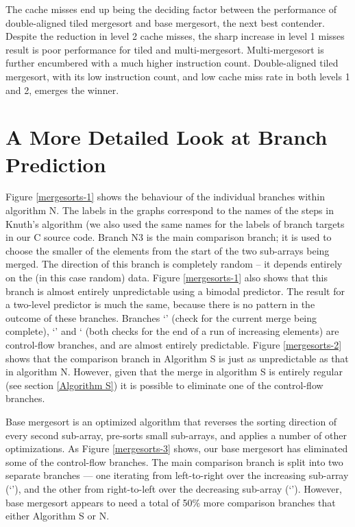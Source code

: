 The cache misses end up being the deciding factor between the performance of
double-aligned tiled mergesort and base mergesort, the next best contender.
Despite the reduction in level 2 cache misses, the sharp increase in level 1
misses result is poor performance for tiled and multi-mergesort. Multi-mergesort
is further encumbered with a much higher instruction count. Double-aligned tiled
mergesort, with its low instruction count, and low cache miss rate in both
levels 1 and 2, emerges the winner.

\section{A More Detailed Look at Branch Prediction}


Figure \ref{mergesorts-1} shows the behaviour of the individual branches within
algorithm N.  The labels in the graphs correspond to the names of the steps in
Knuth's algorithm (we also used the same names for the labels of branch targets
in our C source code. Branch N3 is the main comparison branch; it is used to
choose the smaller of the elements from the start of the two sub-arrays being
merged. The direction of this branch is completely random -- it depends entirely
on the (in this case random) data. Figure \ref{mergesorts-1} also shows that
this branch is almost entirely unpredictable using a bimodal predictor. The
result for a two-level predictor is much the same, because there is no pattern
in the outcome of these branches. Branches `' (check for the current
merge being complete), `' and ` (both checks for the end of a run of
increasing elements) are control-flow branches, and are almost entirely
predictable. Figure \ref{mergesorts-2} shows that the comparison branch in
Algorithm S is just as unpredictable as that in algorithm N. However, given that
the merge in algorithm S is entirely regular (see section \ref{Algorithm S}) it
is possible to eliminate one of the control-flow branches.

Base mergesort is an optimized algorithm that reverses the sorting direction of
every second sub-array, pre-sorts small sub-arrays, and applies a number of
other optimizations. As Figure \ref{mergesorts-3} shows, our base mergesort has
eliminated some of the control-flow branches. The main comparison branch is
split into two separate branches --- one iterating from left-to-right over the
increasing sub-array (`'), and the other from right-to-left over the
decreasing sub-array (`').  However, base mergesort appears to need a
total of 50\% more comparison branches that either Algorithm S or N.

